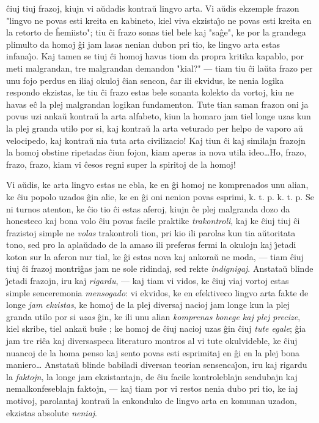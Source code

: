 \^ciuj tiuj frazoj, kiujn vi a\u udadis kontra\u u lingvo arta. Vi
a\u udis ekzemple frazon "lingvo ne povas esti kreita en kabineto,
kiel viva ekzista\^{\j}o ne povas esti kreita en la retorto de
\^hemiisto"; tiu \^ci frazo sonas tiel bele kaj "sa\^ge", ke por
la grandega plimulto da homoj \^gi jam lasas nenian dubon pri tio,
ke lingvo arta estas infana\^{\j}o. Kaj tamen se tiuj \^ci homoj
havus tiom da propra kritika kapablo, por meti malgrandan, tre
malgrandan demandon "kial?" --- tiam tiu \^ci la\u uta frazo per
unu fojo perdus en iliaj okuloj \^cian sencon, \^car ili ekvidus, ke
nenia logika respondo ekzistas, ke tiu \^ci frazo estas bele sonanta
kolekto da vortoj, kiu ne havas e\^c la plej malgrandan logikan
fundamenton. Tute tian saman frazon oni ja povus uzi anka\u u
kontra\u u la arta alfabeto, kiun la homaro jam tiel longe uzas kun
la plej granda utilo por si, kaj kontra\u u la arta veturado per
helpo de vaporo a\u u velocipedo, kaj kontra\u u nia tuta arta
civilizacio! Kaj tiun \^ci kaj similajn frazojn la homoj obstine
ripetadas \^ciun fojon, kiam aperas ia nova utila ideo\dots Ho,
frazo, frazo, frazo, kiam vi \^cesos regni super la spiritoj de la
homoj!

   Vi a\u udis, ke arta lingvo estas ne ebla, ke en \^gi homoj ne
komprenados unu alian, ke \^ciu popolo uzados \^gin alie, ke en \^gi
oni nenion povas esprimi, k. t. p. k. t. p. Se ni turnos atenton, ke
\^cio tio \^ci estas aferoj, kiujn \^ce plej malgranda dozo da
honesteco kaj bona volo \^ciu povas facile praktike {\sl
trakontroli}, kaj ke \^ciuj tiuj \^ci frazistoj simple ne {\sl
volas} trakontroli tion, pri kio ili parolas kun tia a\u utoritata
tono, sed pro la apla\u udado de la amaso ili preferas fermi la
okulojn kaj \^{\j}etadi koton sur la aferon nur tial, ke \^gi estas
nova kaj ankora\u u ne moda, --- tiam \^ciuj tiuj \^ci frazoj
montri\^gas jam ne sole ridindaj, sed rekte {\sl indignigaj}.
Anstata\u u blinde \^{\j}etadi frazojn, iru kaj {\sl rigardu}, ---
kaj tiam vi vidos, ke \^ciuj viaj vortoj estas simple senceremonia
{\sl mensogado}: vi ekvidos, ke en efektiveco lingvo arta fakte de
longe {\sl jam ekzistas}, ke homoj de la plej diversaj nacioj jam
longe kun la plej granda utilo por si {\sl uzas} \^gin, ke ili unu
alian {\sl komprenas bonege kaj plej precize}, kiel skribe, tiel
anka\u u bu\^se ; ke homoj de \^ciuj nacioj uzas \^gin \^ciuj {\sl
tute egale}; \^gia jam tre ri\^ca kaj diversaspeca literaturo
montros al vi tute okulvideble, ke \^ciuj nuancoj de la homa penso
kaj sento povas esti esprimitaj en \^gi en la plej bona maniero\dots
Anstata\u u blinde babiladi diversan teorian sensenca\^{\j}on, iru
kaj rigardu la {\sl faktojn}, la longe jam ekzistantajn, de \^ciu
facile kontroleblajn sendubajn kaj nemalkonfeseblajn faktojn, ---
kaj tiam por vi restos nenia dubo pri tio, ke iaj motivoj,
parolantaj kontra\u u la enkonduko de lingvo arta en komunan uzadon,
ekzistas absolute {\sl neniaj}.

